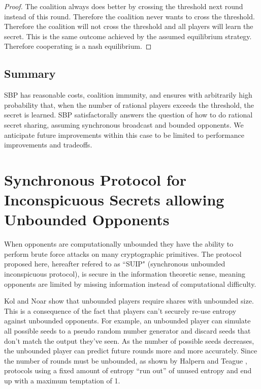 \documentclass{dalcsthesis}
\begin{document}
\begin{proof}
The coalition always does better by crossing the threshold next round instead of this round. Therefore the coalition never wants to cross the threshold. Therefore the coalition will not cross the threshold and all players will learn the secret. This is the same outcome achieved by the assumed equilibrium strategy. Therefore cooperating is a nash equilibrium.
\end{proof}


\subsection{Summary}

SBP has reasonable costs, coalition immunity, and ensures with arbitrarily high probability that, when the number of rational players exceeds the threshold, the secret is learned. SBP satisfactorally answers the question of how to do rational secret sharing, assuming synchronous broadcast and bounded opponents. We anticipate future improvements within this case to be limited to performance improvements and tradeoffs.



\section{Synchronous Protocol for Inconspicuous Secrets allowing Unbounded Opponents}

When opponents are computationally unbounded they have the ability to perform brute force attacks on many cryptographic primitives. The protocol proposed here, hereafter refered to as ``SUIP" (synchronous unbounded inconspicuous protocol), is secure in the information theoretic sense, meaning opponents are limited by missing information instead of computational difficulty.

Kol and Noar \cite{kol08} show that unbounded players require shares with unbounded size. This is a consequence of the fact that players can't securely re-use entropy against unbounded opponents. For example, an unbounded player can simulate all possible seeds to a pseudo random number generator and discard seeds that don't match the output they've seen. As the number of possible seeds decreases, the unbounded player can predict future rounds more and more accurately. Since the number of rounds must be unbounded, as shown by Halpern and Teague \cite{halpern04}, protocols using a fixed amount of entropy ``run out'' of unused entropy and end up with a maximum temptation of 1.
\end{document}
